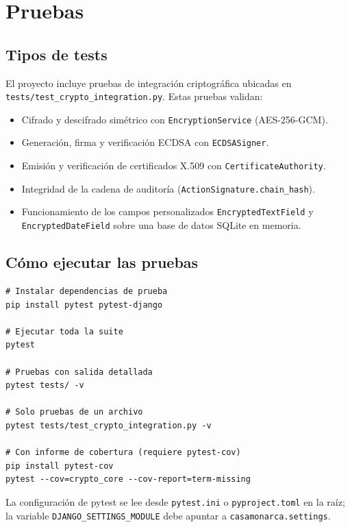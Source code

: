 \documentclass[10pt,letterpaper]{report}
\begin{document}
\chapter{Pruebas}

\section{Tipos de tests}

El proyecto incluye pruebas de integración criptográfica ubicadas en \texttt{tests/test\_crypto\_integration.py}. Estas pruebas validan:
\begin{itemize}[leftmargin=*]
    \item Cifrado y descifrado simétrico con \texttt{EncryptionService} (AES-256-GCM).
    \item Generación, firma y verificación ECDSA con \texttt{ECDSASigner}.
    \item Emisión y verificación de certificados X.509 con \texttt{CertificateAuthority}.
    \item Integridad de la cadena de auditoría (\texttt{ActionSignature.chain\_hash}).
    \item Funcionamiento de los campos personalizados \texttt{EncryptedTextField} y \texttt{EncryptedDateField} sobre una base de datos SQLite en memoria.
\end{itemize}

\section{Cómo ejecutar las pruebas}

\begin{lstlisting}
# Instalar dependencias de prueba
pip install pytest pytest-django

# Ejecutar toda la suite
pytest

# Pruebas con salida detallada
pytest tests/ -v

# Solo pruebas de un archivo
pytest tests/test_crypto_integration.py -v

# Con informe de cobertura (requiere pytest-cov)
pip install pytest-cov
pytest --cov=crypto_core --cov-report=term-missing
\end{lstlisting}

La configuración de pytest se lee desde \texttt{pytest.ini} o \texttt{pyproject.toml} en la raíz; la variable \texttt{DJANGO\_SETTINGS\_MODULE} debe apuntar a \texttt{casamonarca.settings}.
\end{document}
